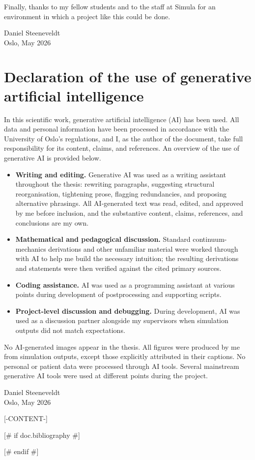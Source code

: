 \documentclass[a4paper, UKenglish, 11pt]{report}
\begin{document}
Finally, thanks to my fellow students and to the staff at Simula for an environment in which a project like this could be done.

\noindent Daniel Steeneveldt\\
Oslo, May 2026

\chapter*{Declaration of the use of generative artificial intelligence}

In this scientific work, generative artificial intelligence (AI) has been used. All data and personal information have been processed in accordance with the University of Oslo's regulations, and I, as the author of the document, take full responsibility for its content, claims, and references. An overview of the use of generative AI is provided below.

\begin{itemize}
  \item \textbf{Writing and editing.} Generative AI was used as a writing assistant throughout the thesis: rewriting paragraphs, suggesting structural reorganisation, tightening prose, flagging redundancies, and proposing alternative phrasings. All AI-generated text was read, edited, and approved by me before inclusion, and the substantive content, claims, references, and conclusions are my own.
  \item \textbf{Mathematical and pedagogical discussion.} Standard continuum-mechanics derivations and other unfamiliar material were worked through with AI to help me build the necessary intuition; the resulting derivations and statements were then verified against the cited primary sources.
  \item \textbf{Coding assistance.} AI was used as a programming assistant at various points during development of postprocessing and supporting scripts.
  \item \textbf{Project-level discussion and debugging.} During development, AI was used as a discussion partner alongside my supervisors when simulation outputs did not match expectations.
\end{itemize}

No AI-generated images appear in the thesis. All figures were produced by me from simulation outputs, except those explicitly attributed in their captions. No personal or patient data were processed through AI tools. Several mainstream generative AI tools were used at different points during the project.

\noindent Daniel Steeneveldt\\
Oslo, May 2026

\tableofcontents
\newpage

[-CONTENT-]


[# if doc.bibliography #]

[# endif #]
\end{document}
